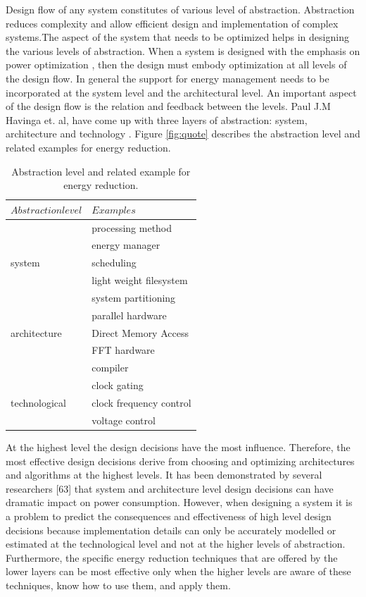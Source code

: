  Design flow of any system constitutes of various level of abstraction. Abstraction reduces complexity  and allow efficient design and implementation of complex systems.The aspect of the system that needs to be optimized helps in designing the various levels of abstraction. When a system is designed with the emphasis on power optimization , then the design must embody optimization at all levels of the design flow. In general the support for energy management needs to be incorporated at the system level and the architectural level. An important aspect of the design flow is the relation and feedback between the levels. Paul J.M Havinga et. al, 
 have come up with three layers of abstraction: system, architecture and technology \cite{havinga,havinga2,havinga3}. Figure \ref{fig:quote} describes the abstraction level and related examples for energy reduction.
 \begin{table}
 	\centering
 	\begin{tabular}{|l|l|}
 		\hline
 		$Abstraction level$ & $Examples$  \\
 		\hline
 		  & processing method \\
 		  & energy manager \\
 		  system & scheduling \\
 		  & light weight filesystem \\
 		  & system partitioning \\
 		  & parallel hardware \\
 		  architecture & Direct Memory Access \\
 		  & FFT hardware \\
 		  & compiler \\
 		  & clock gating \\
 		  technological & clock frequency control \\
 		  & voltage control \\
 		\hline
 	\end{tabular}
 	\caption{Abstraction level and related example for energy reduction.}
 	\label{table:abstraction}
 \end{table}


 At the highest level the design decisions have the most influence. 
 Therefore, the most effective design decisions derive from choosing and optimizing 
 architectures and algorithms at the highest levels. It has been demonstrated by several 
 researchers [63] that system and architecture level design decisions can have dramatic 
 impact on power consumption. However, when designing a system it is a problem to 
 predict the consequences and effectiveness of high level design decisions because implementation details can only be accurately modelled or estimated at the technological 
 level and not at the higher levels of abstraction. Furthermore, the specific energy 
 reduction techniques that are offered by the lower layers can be most effective only 
 when the higher levels are aware of these techniques, know how to use them, and apply 
 them.
 
